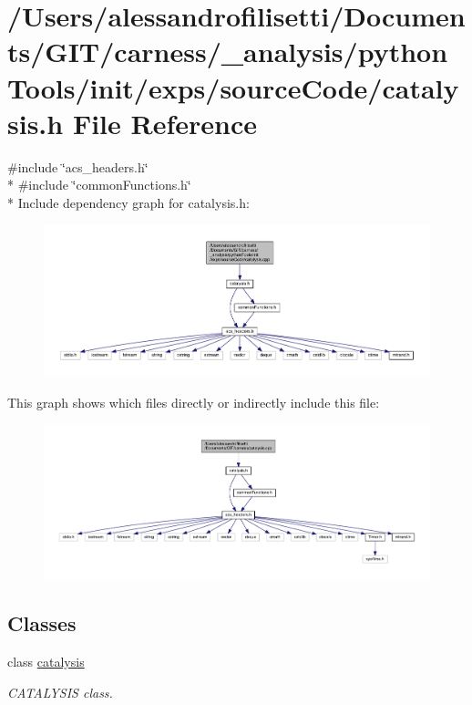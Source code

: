 \hypertarget{a00054}{\section{/\-Users/alessandrofilisetti/\-Documents/\-G\-I\-T/carness/\-\_\-analysis/python\-Tools/init/exps/source\-Code/catalysis.h File Reference}
\label{a00054}
}
{\ttfamily \#include \char`\"{}acs\-\_\-headers.\-h\char`\"{}}\\*
{\ttfamily \#include \char`\"{}common\-Functions.\-h\char`\"{}}\\*
Include dependency graph for catalysis.\-h\-:
\nopagebreak
\begin{figure}[H]
\begin{center}
\leavevmode
\includegraphics[width=350pt]{a00166}
\end{center}
\end{figure}
This graph shows which files directly or indirectly include this file\-:
\nopagebreak
\begin{figure}[H]
\begin{center}
\leavevmode
\includegraphics[width=350pt]{a00167}
\end{center}
\end{figure}
\subsection*{Classes}
\begin{DoxyCompactItemize}
\item 
class \hyperlink{a00012}{catalysis}
\begin{DoxyCompactList}\small\item\em C\-A\-T\-A\-L\-Y\-S\-I\-S class. \end{DoxyCompactList}\end{DoxyCompactItemize}
